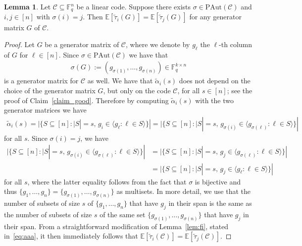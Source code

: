 \documentclass[11pt,a4paper,reqno,twoside]{amsart}
\theoremstyle{definition}
\newtheorem{lemma}{Lemma}
\newcommand{\F}{\mathbb{F}}
\newcommand{\E}{\mathbb{E}}
\newcommand{\mC}{\mathcal{C}}
\begin{document}
\begin{lemma} \label{lem:auto}
    Let $\mC \subseteq \F_q^n$ be a linear code. Suppose there exists $\sigma \in \mbox{PAut}(\mC)$ and $i,j \in [n]$ with
    $\sigma(i)=j$. Then $\E[\widetilde{\tau}_i(G)]=\E[\widetilde{\tau}_j(G)]$ for any generator matrix $G$ of $\mC$.
\end{lemma}
\begin{proof}
Let $G$ be a generator matrix of $\mC$, where we denote by $g_{\ell}$ the $\ell$-th column of $G$ for $\ell \in [n]$. Since $\sigma \in \mbox{PAut}(\mC)$ we have that 
\begin{align*}
    \sigma(G) := (g_{\sigma(1)},\dots, g_{\sigma(n)}) \in \F_q^{k \times n}
\end{align*}
is a generator matrix for $\mC$ as well. 
We have that $\widetilde{\alpha}_i(s)$ does not depend on the choice of the generator matrix $G$, but only on the code $\mC$, for all $s \in [n]$; see the proof of Claim~\ref{claim_good}. 
Therefore by computing $\widetilde{\alpha}_i(s)$ with the two generator matrices we have
\begin{align*}
    \widetilde{\alpha}_i(s) = |\{S \subseteq [n] : |S| = s, \, g_i \in \langle g_{\ell} : {\ell} \in S\rangle\}| =
     |\{S \subseteq [n] : |S| = s, \, g_{\sigma(i)} \in \langle g_{\sigma({\ell})} : {\ell} \in S\rangle\}|
\end{align*}
for all $s$.
Since $\sigma(i)=j$, we have
\begin{align*}
   |\{S \subseteq [n] : |S| = s, \, g_{\sigma(i)} \in \langle g_{\sigma({\ell})} : {\ell} \in S\rangle\}| &= |\{S \subseteq [n] : |S| = s, \, g_j \in \langle g_{\sigma({\ell})} : {\ell} \in S\rangle\}|  \\
   &= |\{S \subseteq [n] : |S| = s, \, g_j \in \langle g_{\ell} : {\ell} \in S\rangle\}|   
\end{align*}
for all $s$, where the latter equality follows from the fact that $\sigma$ is bijective and thus $\{g_1,\dots,g_n\} = \{g_{\sigma(1)},\dots,g_{\sigma(n)}\}$ as multisets. In more detail, we use that the number of subsets of size $s$ of $\{g_1,\dots,g_n\}$ that have $g_j$ in their span is the same as the number of subsets of size $s$ of the same set $\{g_{\sigma(1)},\dots,g_{\sigma(n)}\}$ that have $g_j$ in their span. From a straightforward modification of Lemma~\ref{lem:fi}, stated in~\eqref{eq:aaa}, it then immediately follows that $\E[\widetilde{\tau}_i(\mC)]=\E[\widetilde{\tau}_j(\mC)]$.
\end{proof}
\end{document}
